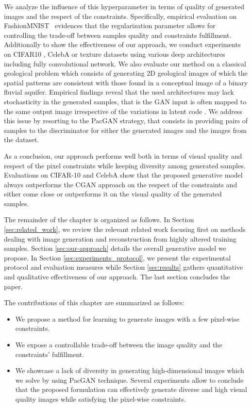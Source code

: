  We analyze the influence of this hyperparameter in terms of quality of generated images and the respect of the constraints. Specifically, empirical evaluation on FashionMNIST~\citep{Xiao2017} evidences that the regularization parameter allows for controlling the trade-off between samples quality and constraints fulfillment. 
Additionally to show the effectiveness of our approach, we conduct experiments on CIFAR10 \citep{Krizhevsky2009}, CelebA \citep{Liu2015} or texture \citep{Jetchev2017} datasets using various deep architectures including fully convolutional network. We also evaluate our method on a classical geological problem which consists of generating 2D geological images of which the spatial patterns are consistent with those found in a conceptual image of a binary fluvial aquifer\citep{Strebelle2002}\citep{Laloy2018}. Empirical findings reveal that the used architectures may lack stochasticity in the generated samples, that is the GAN input is often mapped to the same output image irrespective of the variations in latent code \citep{Yang2019}. We address this issue by resorting to the PacGAN \citep{Lin2018} strategy, that consists in providing pairs of samples to the discriminator for either the generated images and the images from the dataset.

As a conclusion, our approach performs well both in terms of visual quality and respect of the pixel constraints while keeping diversity among generated samples. Evaluations on CIFAR-10 and CelebA show that the proposed generative model always outperforms the CGAN approach on the respect of the constraints and either come close or outperforms it on the visual quality of the generated samples.

The remainder of the chapter is organized as follows. In Section \ref{sec:related_work}, we review the relevant related  work focusing first on methods dealing with image generation and reconstruction from highly altered training samples.  Section \ref{sec:our-approach}  details the overall generative model we propose. In Section \ref{sec:experiments_protocol}, we present the experimental protocol and evaluation measures while Section \ref{sec:results} gathers quantitative and qualitative effectiveness of our approach. The last section concludes the paper.

The contributions of this chapter are summarized as follows:
\begin{itemize}[nosep]
	\item We propose a method for learning to generate images with a few pixel-wise constraints.
	\item We expose a controllable trade-off between the image quality and the constraints' fulfillment.
	\item We showcase a lack of diversity in generating high-dimensional images which we solve by using  PacGAN\citep{Lin2018} technique. Several experiments allow to conclude that the proposed formulation can effectively generate diverse and high visual quality images while satisfying the pixel-wise constraints. 
\end{itemize}

